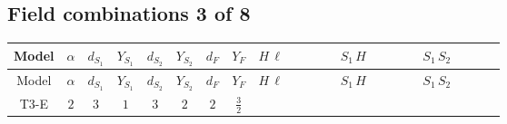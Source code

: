 \documentclass[8pt]{article}
\begin{document}
\begin{landscape}
\subsection*{Field combinations 3 of 8}
\begin{longtable}{@{}cccccccc >{\raggedright\arraybackslash}p{0.21\linewidth} >{\raggedright\arraybackslash}p{0.21\linewidth} >{\raggedright\arraybackslash}p{0.21\linewidth}@{}}
\toprule
Model & $\alpha$ & $d_{S_1}$ & $Y_{S_1}$ & $d_{S_2}$ & $Y_{S_2}$ & $d_F$ & $Y_F$ & $H\,\ell$ & $S_1\,H$ & $S_1\,S_2$ \\
\midrule
\endfirsthead
\toprule
Model & $\alpha$ & $d_{S_1}$ & $Y_{S_1}$ & $d_{S_2}$ & $Y_{S_2}$ & $d_F$ & $Y_F$ & $H\,\ell$ & $S_1\,H$ & $S_1\,S_2$ \\
\midrule
\endhead
T3-E & $2$ & $3$ & $1$ & $3$ & $2$ & $2$ & $\frac{3}{2}$ & \scriptsize\adjustbox{max width=\linewidth}{$\begin{gathered} -\frac{2 \sqrt{\frac{2}{3}} \hbar  \overline{y_{1,i_1,r_1}} \overline{y_{2,i_2,r_1}} L_{a_4,i_2}{}^T\, C\, P_L\, L_{a_2,i_1} H_{a_1} H_{a_3} \lambda_5 \epsilon_{a_1,a_2} \epsilon_{a_3,a_4}}{\epsilon  M_F} \\ -\frac{2 \sqrt{\frac{2}{3}} \hbar  \overline{y_{1,i_1,r_1}} \overline{y_{2,i_2,r_1}} L_{a_4,i_2}{}^T\, C\, P_L\, L_{a_2,i_1} H_{a_1} H_{a_3} \lambda_5 \epsilon_{a_1,a_2} \epsilon_{a_3,a_4}}{M_F} \\ -\frac{2 \sqrt{\frac{2}{3}} \hbar  \overline{\lambda_5} \overline{L_{a_3,i_1}}\, C\, P_R\, \overline{L_{a_4,i_2}}{}^T y_{1,i_1,r_1} y_{2,i_2,r_1} \epsilon_{a_1,a_3} \epsilon_{a_2,a_4} H_{a_1}{}^{\dagger } H_{a_2}{}^{\dagger }}{\epsilon  M_F}\end{gathered}$} & \scriptsize\adjustbox{max width=\linewidth}{$\begin{gathered} -\frac{2 \hbar  \overline{y_{1,i_1,r_1}} \overline{Y_{e,i_2,i_3}} H_{a_1} S_{1,j_1} y_{1,i_2,r_1} Y_{e,i_1,i_3} H_{a_1}{}^{\dagger } S_{1,j_1}{}^{\dagger }}{\sqrt{3} \epsilon } \\ -\frac{2 \hbar  \overline{y_{1,i_1,r_1}} \overline{Y_{e,i_2,i_3}} H_{a_1} S_{1,j_1} y_{1,i_2,r_1} Y_{e,i_1,i_3} H_{a_1}{}^{\dagger } S_{1,j_1}{}^{\dagger }}{\sqrt{3}} \\ +\frac{2 i \sqrt{\frac{2}{3}} \hbar  \overline{y_{1,i_1,r_1}} \overline{Y_{e,i_2,i_3}} H_{a_2} S_{1,j_2} y_{1,i_2,r_1} Y_{e,i_1,i_3} H_{a_1}{}^{\dagger } S_{1,j_1}{}^{\dagger } \mathcal{I}_{H1,a_1,a_2,j_1,j_2}{}^1}{\epsilon }\end{gathered}$} & \scriptsize\adjustbox{max width=\linewidth}{$\begin{gathered} -\frac{4 \hbar  \overline{y_{1,i_1,r_1}} \overline{y_{2,i_2,r_2}} S_{1,j_2} S_{2,j_2} y_{1,i_2,r_1} y_{2,i_1,r_2} S_{1,j_1}{}^{\dagger } S_{2,j_1}{}^{\dagger }}{3 \epsilon } \\ -\frac{4}{3} \hbar  \overline{y_{1,i_1,r_1}} \overline{y_{2,i_2,r_1}} S_{1,j_2} S_{2,j_2} y_{1,i_2,r_2} y_{2,i_1,r_2} S_{1,j_1}{}^{\dagger } S_{2,j_1}{}^{\dagger } \\ -\frac{4}{3} \hbar  \overline{y_{1,i_1,r_1}} \overline{y_{2,i_2,r_1}} S_{1,j_2} S_{2,j_2} y_{1,i_1,r_2} y_{2,i_2,r_2} S_{1,j_1}{}^{\dagger } S_{2,j_1}{}^{\dagger }\end{gathered}$} \\

\end{longtable}
\end{landscape}
\end{document}
